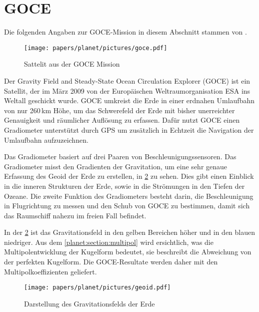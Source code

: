 %
%
%
%
\section{GOCE
\label{planet:section:goce}}

Die folgenden Angaben zur GOCE-Mission in diesem Abschnitt stammen von \cite{planet:goce}.
%
\begin{figure}
    \centering
    \texttt{[image: papers/planet/pictures/goce.pdf]}
    \caption{Sattelit aus der GOCE Mission \cite{planet:gocepic}
        \label{planet:fig:goce}}
\end{figure}%

Der Gravity Field and Steady-State Ocean Circulation Explorer (GOCE) ist ein Satellit, der im März 2009 von der Europäischen Weltraumorganisation ESA ins Weltall geschickt wurde.
%
GOCE umkreist die Erde in einer erdnahen Umlaufbahn von nur 260\,km Höhe, um das Schwerefeld der Erde mit bisher unerreichter Genauigkeit und räumlicher Auflösung zu erfassen.
Dafür nutzt GOCE einen Gradiometer unterstützt durch GPS um zusätzlich in Echtzeit die Navigation der Umlaufbahn aufzuzeichnen.
%
%
%

Das Gradiometer basiert auf drei Paaren von Beschleunigungssensoren.
%
Das Gradiometer misst den Gradienten der Gravitation, um eine sehr genaue Erfassung des Geoid der Erde zu erstellen, in \cref{planet:fig:geoid} zu sehen.
%
Dies gibt einen Einblick in die inneren Strukturen der Erde, sowie in die Strömungen in den Tiefen der Ozeane.
%
%
Die zweite Funktion des Gradiometers besteht darin, die Beschleunigung in Flugrichtung zu messen und den Schub von GOCE zu bestimmen, damit sich das Raumschiff nahezu im freien Fall befindet.

In der \cref{planet:fig:geoid} ist das Gravitationsfeld in den gelben Bereichen höher und in den blauen niedriger.
Aus dem \cref{planet:section:multipol} wird ersichtlich, was die Multipolentwicklung der Kugelform bedeutet, sie beschreibt die Abweichung von der perfekten Kugelform.
Die GOCE-Resultate werden daher mit den Multipolkoeffizienten geliefert.

\begin{figure}
    \centering
    \texttt{[image: papers/planet/pictures/geoid.pdf]}
    \caption{Darstellung des Gravitationsfelds der Erde \cite{planet:geoidpic}
        \label{planet:fig:geoid}}
\end{figure}


